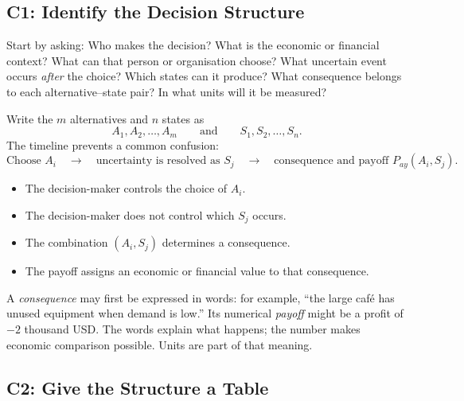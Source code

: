 	
	
	\subsection{C1: Identify the Decision Structure}
	\label{sec:c1-decision-structure}
	
	Start by asking: Who makes the decision? What is the economic or financial
	context? What can that person or organisation choose? What uncertain event
	occurs \emph{after} the choice? Which states can it produce? What consequence
	belongs to each alternative--state pair? In what units will it be measured?
	
	Write the \(m\) alternatives and \(n\) states as
	\[
	A_1,A_2,\ldots,A_m
	\qquad\text{and}\qquad
	S_1,S_2,\ldots,S_n.
	\]
	The timeline prevents a common confusion:
	\[
	\text{Choose }A_i
	\quad\longrightarrow\quad
	\text{uncertainty is resolved as }S_j
	\quad\longrightarrow\quad
	\text{consequence and payoff }P_{ay}(A_i,S_j).
	\]
	
	\begin{itemize}
		\item The decision-maker controls the choice of \(A_i\).
		\item The decision-maker does not control which \(S_j\) occurs.
		\item The combination \((A_i,S_j)\) determines a consequence.
		\item The payoff assigns an economic or financial value to that consequence.
	\end{itemize}
	
	A \emph{consequence} may first be expressed in words: for example, ``the large
	café has unused equipment when demand is low.'' Its numerical \emph{payoff}
	might be a profit of \(-2\) thousand USD. The words explain what happens; the
	number makes economic comparison possible. Units are part of that meaning.
	
	
	
	\subsection{C2: Give the Structure a Table}
	\label{sec:c2-payoff-table}
	
